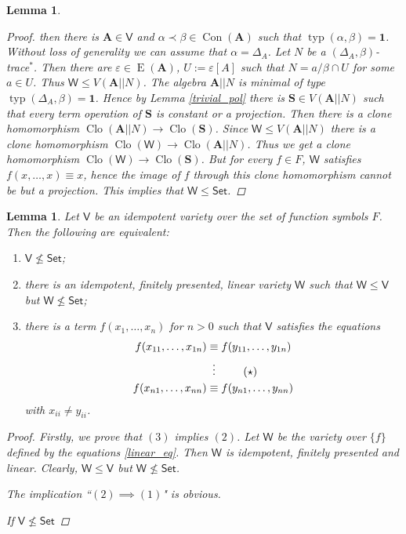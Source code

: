 \documentclass{amsart}
\theoremstyle{plain}
\newtheorem{lemma}[theorem]{Lemma}
\theoremstyle{definition}
\theoremstyle{remark}
\def\epsilon{\varepsilon}
\DeclareMathOperator{\Clo}{Clo}
\DeclareMathOperator{\Con}{Con}
\DeclareMathOperator{\typ}{typ}
\DeclareMathOperator{\Id}{E}
\begin{document}
\begin{lemma}
\begin{proof}
        then there is $\mathbf{A} \in \mathsf{V}$ and $\alpha \prec \beta \in \Con(\mathbf{A})$ such that $\typ(\alpha, \beta) =\mathbf{1}$. 
        Without loss of generality we can assume that $\alpha = \Delta_A$. 
        Let $N$ be a $(\Delta_A, \beta)$-trace$^{*}$.
        Then there are $\epsilon \in \Id(\mathbf{A})$, $U:=\epsilon[A]$ such that $N = a /\beta \cap U$ for some $a \in U$. 
        Thus $\mathsf{W} \le V(\mathbf{A}||N)$. 
        The algebra $\mathbf{A}||N$ is minimal of type $\typ(\Delta_A,\beta)=\mathbf{1}$. 
        Hence by Lemma \ref{trivial_pol}
        there is $\mathbf{S} \in V(\mathbf{A}||N)$ such that every term operation of $\mathbf{S}$ is constant or a projection. 
        Then there is a clone homomorphism $\Clo(\mathbf{A}||N) \to \Clo(\mathbf{S})$.
        Since $\mathsf{W} \le V(\mathbf{A}||N)$ there is a clone homomorphism $\Clo(\mathsf{W}) \to \Clo(\mathbf{A}||N)$. 
        Thus we get a clone homomorphism $\Clo(\mathsf{W}) \to \Clo(\mathbf{S})$. 
        But for every $f \in F$, $\mathsf{W}$ satisfies $f(x, \ldots, x) \equiv x$, hence the image of $f$ through this clone homomorphism cannot be but a projection. 
        This implies that $\mathsf{W} \le \mathsf{Set}$. 
    \end{proof}
\end{lemma}

\begin{lemma}
    \label{lemma_linear}
    Let $\mathsf{V}$ be an idempotent variety over the set of function symbols $F$. 
    Then the following are equivalent: 
    \begin{enumerate}
        \item $\mathsf{V} \nleq \mathsf{Set}$; 
        \item there is an idempotent, finitely presented, linear variety $\mathsf{W}$ such that $\mathsf{W} \le \mathsf{V}$ but $\mathsf{W} \nleq \mathsf{Set}$; 
        \item there is a term $f(x_{1}, \ldots, x_{n})$ for $n>0$ such that $\mathsf{V}$ satisfies the equations 
        \begin{align}
            \label{linear_eq}
            f(x_{11}, \ldots, x_{1n}) & \equiv f(y_{11}, \ldots, y_{1n}) \notag\\
            & \vdotswithin{\equiv} \tag{$\star$}  \\ 
            f(x_{n1}, \ldots, x_{nn}) & \equiv f(y_{n1}, \ldots, y_{nn}) \notag
        \end{align}
        with $x_{ii} \neq y_{ii}$. 
    \end{enumerate}
    \begin{proof}
        Firstly, we prove that $(3)$ implies $(2)$. 
        Let $\mathsf{W}$ be the variety over $\{f\}$ defined by the equations \eqref{linear_eq}. 
        Then $\mathsf{W}$ is idempotent, finitely presented and linear. 
        Clearly, $\mathsf{W} \le \mathsf{V}$ but $\mathsf{W} \nleq \mathsf{Set}$. 

        The implication ``$(2) \implies (1)$" is obvious. 

        If $\mathsf{V} \nleq \mathsf{Set}$
    \end{proof}
\end{lemma}
\end{document}

